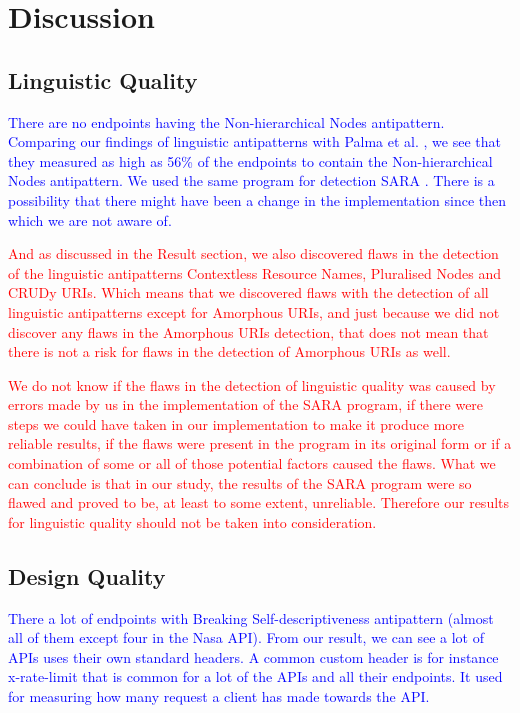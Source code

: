 \section{Discussion}

\subsection{Linguistic Quality}

\textcolor{blue}{There are no endpoints having the Non-hierarchical Nodes antipattern. Comparing our findings of linguistic antipatterns with Palma et al. \cite{linguistic}, we see that they measured as high as 56\% of the endpoints to contain the Non-hierarchical Nodes antipattern. We used the same program for detection SARA \cite{linguistic}. There is a possibility that there might have been a change in the implementation since then which we are not aware of.}

\textcolor{red}{
And as discussed in the Result section, we also discovered flaws in the detection of the linguistic antipatterns Contextless Resource Names, Pluralised Nodes and CRUDy URIs. Which means that we discovered flaws with the detection of all linguistic antipatterns except for Amorphous URIs, and just because we did not discover any flaws in the Amorphous URIs detection, that does not mean that there is not a risk for flaws in the detection of Amorphous URIs as well.
}

\textcolor{red}{We do not know if the flaws in the detection of linguistic quality was caused by errors made by us in the implementation of the SARA program, if there were steps we could have taken in our implementation to make it produce more reliable results, if the flaws were present in the program in its original form or if a combination of some or all of those potential factors caused the flaws. What we can conclude is that in our study, the results of the SARA program were so flawed and proved to be, at least to some extent, unreliable. Therefore our results for linguistic quality should not be taken into consideration.}

\subsection{Design Quality}

\textcolor{blue}{There a lot of endpoints with Breaking Self-descriptiveness antipattern (almost all of them except four in the Nasa API). From our result, we can see a lot of APIs uses their own standard headers. A common custom header is for instance x-rate-limit that is common for a lot of the APIs and all their endpoints. It used for measuring how many request a client has made towards the API. }


